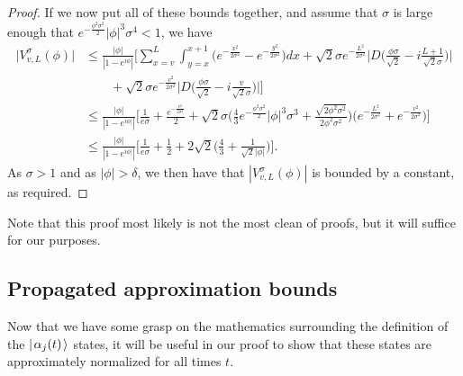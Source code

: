 \documentclass[../thesis-main/thesis-main]{subfiles}
\begin{document}
\begin{proof}
If we now put all of these bounds together, and assume that $\sigma$ is large enough that $e^{-\frac{\phi^2\sigma^2}{2}}|\phi|^3\sigma^4 < 1$, we have
\begin{align}
  \big|V_{v,L}^\sigma(\phi)\big| 
  &\leq\frac{|\phi|}{|1-e^{i\phi}|} \Bigg[\sum_{x=v}^{L} \int_{y=x}^{x+1} \big(e^{-\frac{x^2}{2\sigma^2}} - e^{-\frac{y^2}{2\sigma^2}}\big) dx + \sqrt{2} \sigma e^{-\frac{L^2}{2\sigma^2}} \bigg| D\bigg(\frac{\phi \sigma}{\sqrt{2}} - i \frac{L+1}{\sqrt{2}\sigma} \bigg) \bigg| \nonumber\\
  & \qquad + \sqrt{2} \sigma e^{-\frac{v^2}{2\sigma^2}}  \bigg| D\bigg(\frac{\phi \sigma}{\sqrt{2}} - i \frac{v}{\sqrt{2}\sigma} \bigg) \bigg|\Bigg]\\
  &\leq \frac{|\phi|}{|1-e^{i\phi|}|} \Bigg[\frac{1}{e\sigma} + \frac{e^{-\frac{v^2}{2\sigma^2}}}{2} + \sqrt{2}\sigma \bigg(\frac{4}{3} e^{-\frac{\phi^2\sigma^2}{2}} |\phi|^3 \sigma^3 + \frac{\sqrt{2 \phi^2\sigma^2}}{2 \phi^2\sigma^2}\bigg)\bigg(e^{-\frac{L^2}{2\sigma^2}} + e^{-\frac{v^2}{2\sigma^2}}\bigg)\Bigg]\\
  &\leq  \frac{|\phi|}{|1-e^{i\phi|}|}\Bigg[\frac{1}{e\sigma} + \frac{1}{2} + 2\sqrt{2}\bigg(\frac{4}{3}  + \frac{1}{\sqrt{2} |\phi|} \bigg) \Bigg].
\end{align}
As $\sigma>1$ and as $|\phi| > \delta$, we then have that $|V_{v,L}^\sigma(\phi)|$ is bounded by a constant, as required.
\end{proof}

Note that this proof most likely is not the most clean of proofs, but it will suffice for our purposes.




\subsection{Propagated approximation bounds}

Now that we have some grasp on the mathematics surrounding the definition of the $|\mspace{2mu} \alpha_j(t) \mspace{2mu} \rangle$ states, it will be useful in our proof to show that these states are approximately normalized for all times $t$.  
\end{document}
